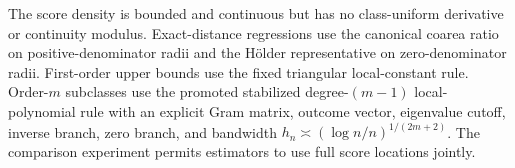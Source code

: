 The score density is bounded and continuous but has no class-uniform derivative or continuity modulus.  Exact-distance regressions use the canonical coarea ratio on positive-denominator radii and the H\"older representative on zero-denominator radii.  First-order upper bounds use the fixed triangular local-constant rule.  Order-\(m\) subclasses use the promoted stabilized degree-\((m-1)\) local-polynomial rule with an explicit Gram matrix, outcome vector, eigenvalue cutoff, inverse branch, zero branch, and bandwidth \(h_n\asymp(\log n/n)^{1/(2m+2)}\).  The comparison experiment permits estimators to use full score locations jointly.